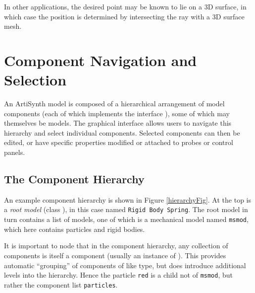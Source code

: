 \documentclass{article}
\begin{document}
In other applications, the desired point may be known to lie on a 3D
surface, in which case the position is determined by intersecting the
ray with a 3D surface mesh.

\section{Component Navigation and Selection}


An ArtiSynth model is composed of a hierarchical arrangement of
model components (each of which implements the interface 
), some of which may themselves
be models. The graphical interface allows users to navigate this
hierarchy and select individual components. Selected components
can then be edited, or have specific properties modified or attached
to probes or control panels.

\subsection{The Component Hierarchy}

An example component hierarchy is shown in Figure
\ref{hierarchyFig}. At the top is a {\it root model} (class
), in this case named {\tt Rigid Body Spring}.  The
root model in turn contains a list of models, one of which is a
mechanical model named {\tt msmod}, which here contains particles and
rigid bodies.

It is important to node that in the component hierarchy, any collection
of components is itself a component (usually an instance of
). This provides automatic ``grouping'' of
components of like type, but does introduce additional levels into the
hierarchy. Hence the particle {\tt red} is a child not of {\tt msmod},
but rather the component list {\tt particles}.
\end{document}
